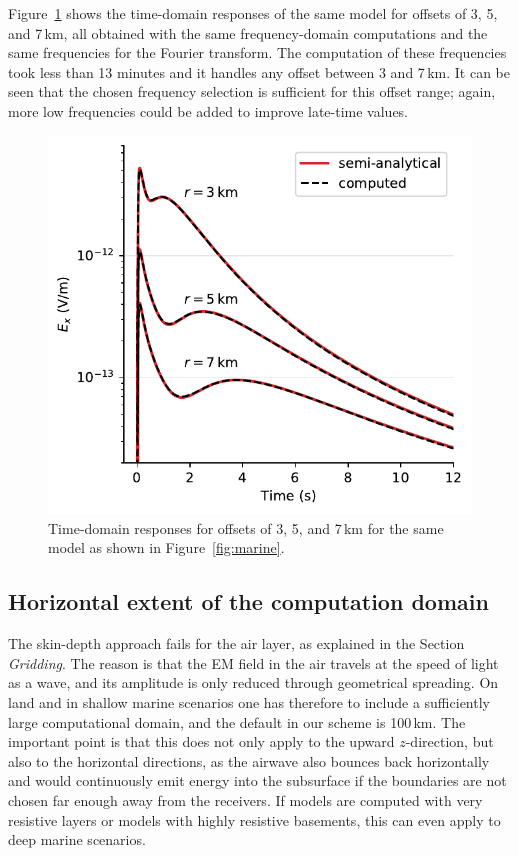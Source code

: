 \documentclass[extra, camera,%
    referee,     %
]{gji}
\newlength{\cwidth}
\begin{document}
Figure~\ref{fig:marine-multioffset} shows the time-domain responses of the same
model for offsets of 3, 5, and 7\,km, all obtained with the same
frequency-domain computations and the same frequencies for the Fourier
transform. The computation of these frequencies took less than 13 minutes and
it handles any offset between 3 and 7\,km. It can be seen that the chosen
frequency selection is sufficient for this offset range; again, more low
frequencies could be added to improve late-time values.
%
\begin{figure}
  \centering
  \includegraphics[width=\cwidth]{07-marine-multioffset}
  \caption{Time-domain responses for offsets of 3, 5, and 7\,km for the same
    model as shown in Figure~\ref{fig:marine}.}
  \label{fig:marine-multioffset}
\end{figure}
%


\subsection{Horizontal extent of the computation domain}  %

The skin-depth approach fails for the air layer, as explained in the Section
\emph{Gridding}. The reason is that the EM field in the air travels at the
speed of light as a wave, and its amplitude is only reduced through geometrical
spreading. On land and in shallow marine scenarios one has therefore to include
a sufficiently large computational domain, and the default in our scheme is
100\,km. The important point is that this does not only apply to the upward
$z$-direction, but also to the horizontal directions, as the airwave also
bounces back horizontally and would continuously emit energy into the
subsurface if the boundaries are not chosen far enough away from the receivers.
If models are computed with very resistive layers or models with highly
resistive basements, this can even apply to deep marine scenarios.
\end{document}
